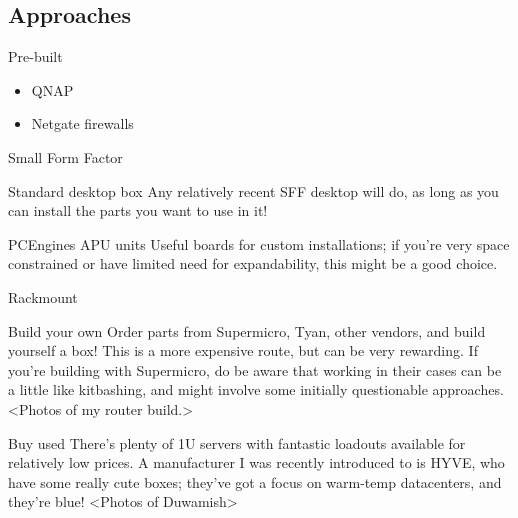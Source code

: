 \documentclass[bigger]{beamer}
\begin{document}
\subsection{Approaches}
\label{sec:org1558c43}

\begin{frame}[label={sec:org3e08734}]{Pre-built}

  \begin{itemize}
  \item QNAP

  \item<2-> Netgate firewalls
  \end{itemize}
\end{frame}

\begin{frame}[label={sec:org1e54b71}]{Small Form Factor}
\begin{block}{Standard desktop box}
Any relatively recent SFF desktop will do, as long as you can install the
parts you want to use in it!
\end{block}

\begin{block}{PCEngines APU units}
Useful boards for custom installations; if you're very space constrained or
have limited need for expandability, this might be a good choice.
\end{block}
\end{frame}

\begin{frame}[label={sec:org94796ed}]{Rackmount}
\begin{block}{Build your own}
Order parts from Supermicro, Tyan, other vendors, and build yourself a box!
This is a more expensive route, but can be very rewarding. If you're
building with Supermicro, do be aware that working in their cases can be a
little like kitbashing, and might involve some initially questionable
approaches. <Photos of my router build.>
\end{block}

\begin{block}{Buy used}
There's plenty of 1U servers with fantastic loadouts available for
relatively low prices. A manufacturer I was recently introduced to is HYVE,
who have some really cute boxes; they've got a focus on warm-temp
datacenters, and they're blue! <Photos of Duwamish>
\end{block}
\end{frame}
\end{document}
